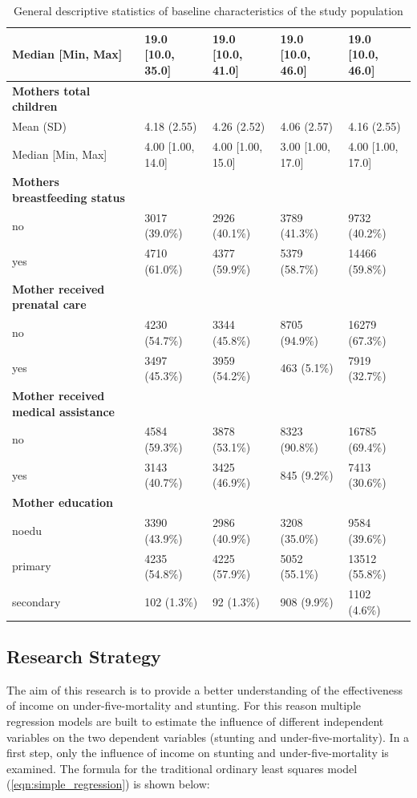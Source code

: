 \documentclass[a4paper, 11pt]{article} %
\begin{document}
\begin{table}[!htbp]
{{\begin{tabular}{lllll}
    Median [Min, Max] &	19.0 [10.0, 35.0] & 19.0 [10.0, 41.0] &	19.0 [10.0, 46.0] &	19.0 [10.0, 46.0] \\ \hline
    \textbf{Mothers total children} & & & &  \\						
    Mean (SD) &	4.18 (2.55) &	4.26 (2.52) &	4.06 (2.57) & 4.16 (2.55) \\
    Median [Min, Max] &	4.00 [1.00, 14.0] & 4.00 [1.00, 15.0] &	3.00 [1.00, 17.0] &	4.00 [1.00, 17.0] \\ \hline
    \textbf{Mothers breastfeeding status} & & & &  \\						
    no &	3017 (39.0\%) &	2926 (40.1\%) &	3789 (41.3\%) & 9732 (40.2\%) \\
    yes &	4710 (61.0\%) &	4377 (59.9\%) &	5379 (58.7\%) & 14466 (59.8\%) \\ \hline
    \textbf{Mother received prenatal care} & & & &  \\						
    no &	4230 (54.7\%) &	3344 (45.8\%) &	8705 (94.9\%) & 16279 (67.3\%) \\
    yes &	3497 (45.3\%) &	3959 (54.2\%) &	463 (5.1\%) & 7919 (32.7\%) \\ \hline
    \textbf{Mother received medical assistance} & & & &  \\						
    no	& 4584 (59.3\%) &	3878 (53.1\%) &	8323 (90.8\%) &	16785 (69.4\%) \\
    yes	& 3143 (40.7\%) &	3425 (46.9\%) &	845 (9.2\%) &	7413 (30.6\%) \\ \hline
    \textbf{Mother education} & & & &  \\						
    noedu &	3390 (43.9\%) &	2986 (40.9\%) &	3208 (35.0\%) & 9584 (39.6\%) \\
    primary &	4235 (54.8\%) &	4225 (57.9\%) &	5052 (55.1\%) & 13512 (55.8\%) \\
    secondary &	102 (1.3\%) &	92 (1.3\%) &	908 (9.9\%) & 1102 (4.6\%) \\ \hline
    \end{tabular}
  }}
  \caption{General descriptive statistics of baseline characteristics of the study population}
  \label{table:descriptive_gen}
\end{table}

\subsection*{Research Strategy}

The aim of this research is to provide a better understanding of the effectiveness of income on under-five-mortality and stunting. For this reason multiple regression models are built to estimate the influence of different independent variables on the two dependent variables (stunting and under-five-mortality). In a first step, only the influence of income on stunting and under-five-mortality is examined. The formula for the traditional ordinary least squares model (\ref{eqn:simple_regression}) is shown below:
\end{document}

